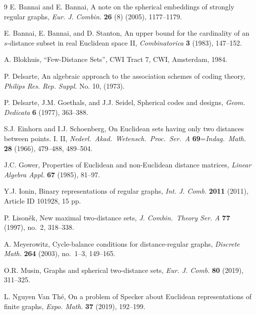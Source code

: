 \documentclass[a4paper, 11pt]{article}
\theoremstyle{definition}
\begin{document}
\begin{thebibliography}{9}
E. Bannai and E. Bannai, 
A note on the spherical embeddings of strongly regular graphs, {\it Eur. J. Combin.} {\bf 26} (8) (2005), 
1177--1179. 

E. Bannai, E. Bannai, and D. Stanton, 
An upper bound for the cardinality of an $s$-distance subset in real Euclidean space II,  {\it Combinatorica} {\bf 3} (1983), 147--152.

A. Blokhuis, ``Few-Distance Sets'', CWI Tract 7, CWI, Amsterdam, 1984.

P. Delsarte, 
An algebraic approach to the association schemes of
coding theory, 
{\it Philips Res. Rep. Suppl.} No. 10, (1973).

P. Delsarte, J.M. Goethals, and J.J. Seidel, 
Spherical codes and designs,
{\it Geom. Dedicata} {\bf 6} (1977), 363--388.

S.J. Einhorn and I.J. Schoenberg,
On Euclidean sets having only two distances between points. I. II,
{\it Nederl.\ Akad.\ Wetensch.\ Proc.\ Ser.\ A} {\bf 69}={\it Indag.\ Math.} {\bf 28} (1966), 
479--488, 489--504.



J.C. Gower, 
Properties of Euclidean and non-Euclidean distance matrices, 
{\it Linear Algebra Appl.} {\bf 67} (1985), 81--97.


Y.J. Ionin, Binary representations of regular graphs, {\it Int. J. Comb.} \textbf{2011} (2011), Article ID 101928, 15 pp.


P. Lison\v{e}k, 
New maximal two-distance sets, 
{\it J. Combin.\ Theory Ser. A} {\bf 77} (1997), no.\ 2, 318--338.

A. Meyerowitz, 
Cycle-balance conditions for distance-regular graphs, 
{\it Discrete Math.} {\bf 264} (2003), no.\ 1--3, 149--165. 

O.R. Musin, Graphs and spherical two-distance sets, {\it Eur. J. Comb.} \textbf{80} (2019), 311--325.



L. Nguyen Van Th\'e, On a problem of Specker about Euclidean representations of finite graphs, {\it Expo. Math.} \textbf{37} (2019), 192--199.




\end{thebibliography}
\end{document}
